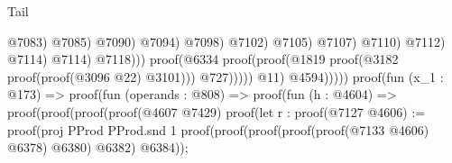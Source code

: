 \begin{lexlean}{Tail}
\begin{coremodule}
                                                                                              @7083)
                                                                                            @7085)
                                                                                          @7090)
                                                                                        @7094)
                                                                                      @7098)
                                                                                    @7102)
                                                                                  @7105)
                                                                                @7107)
                                                                              @7110)
                                                                            @7112)
                                                                          @7114)
                                                                        @7114)
                                                                      @7118)))
                                                            proof(@6334
                                                                proof(proof(@1819
                                                                      proof(@3182
                                                                          proof(proof(@3096 @22)
                                                                              @3101)))
                                                                    @727)))))
                                                    @11)
                                                  @4594)))))
                                      proof(fun (x_1 : @173) =>
                                        proof(fun (operands : @808) =>
                                          proof(fun (h : @4604) =>
                                            proof(proof(proof(proof(@4607 @7429)
                                                    proof(let r : proof(@7127
                                                          @4606) := proof(proj PProd PProd.snd 1
                                                        proof(proof(proof(proof(proof(@7133 @4606)
                                                                  @6378)
                                                                @6380)
                                                              @6382)
                                                            @6384));

\end{coremodule}
\end{lexlean}

